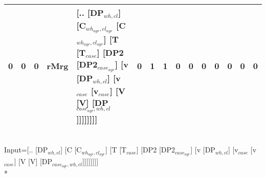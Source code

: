 \begin{tabularx}{\linewidth}{rrrlXrrrrrrrrrr}
   0 &       0 &   0 & rMrg & [.. [DP$_{wh,cl}$] [C$_{wh_{agr},cl_{agr}}$ [C$_{wh_{agr},cl_{agr}}$] [T [T$_{case}$] [DP2 [DP2$_{case_{agr}}$] [v [DP$_{wh,cl}$] [v$_{case}$ [v$_{case}$] [V [V] [DP$_{case_{agr},wh,cl}$]]]]]]]]                                                                                                                                         &            0 &             1 &             1 &                  0 &                0 &                0 &           0 &           0 &                0 &              0 \\
\hline
\end{tabularx}\endgroup\\
\begingroup\scriptsize Input=[.. [DP$_{wh,cl}$] [C [C$_{wh_{agr},cl_{agr}}$] [T [T$_{case}$] [DP2 [DP2$_{case_{agr}}$] [v [DP$_{wh,cl}$] [v$_{case}$ [v$_{case}$] [V [V] [DP$_{case_{agr},wh,cl}$]]]]]]]]\\*
